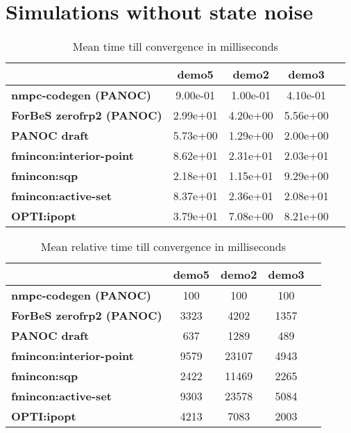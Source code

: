 \section{Simulations without state noise}
\label{appendix:benchmarks trailer without noise}

\begin{table}[H]
	\centering
	\begin{tabular}{|l|c|c|c|c|}
		\hline
		&\textbf{demo5}&\textbf{demo2}&\textbf{demo3}\\\hline
		\textbf{nmpc-codegen (PANOC)}&9.00e-01&1.00e-01&4.10e-01\\\hline
		\textbf{ForBeS zerofrp2 (PANOC)}&2.99e+01&4.20e+00&5.56e+00\\\hline
		\textbf{PANOC draft}&5.73e+00&1.29e+00&2.00e+00\\\hline
		\textbf{fmincon:interior-point}&8.62e+01&2.31e+01&2.03e+01\\\hline
		\textbf{fmincon:sqp}&2.18e+01&1.15e+01&9.29e+00\\\hline
		\textbf{fmincon:active-set}&8.37e+01&2.36e+01&2.08e+01\\\hline
		\textbf{OPTI:ipopt}&3.79e+01&7.08e+00&8.21e+00\\\hline
	\end{tabular}
	\caption{Mean time till convergence in milliseconds}
	\label{tbl:mean time till convergence}
\end{table}

\begin{table}[H]
	\centering
	\begin{tabular}{|l|c|c|c|c|}
		\hline
		&\textbf{demo5}&\textbf{demo2}&\textbf{demo3}\\\hline
		\textbf{nmpc-codegen (PANOC)}&100&100&100\\\hline
		\textbf{ForBeS zerofrp2 (PANOC)}&3323&4202&1357\\\hline
		\textbf{PANOC draft}&637&1289&489\\\hline
		\textbf{fmincon:interior-point}&9579&23107&4943\\\hline
		\textbf{fmincon:sqp}&2422&11469&2265\\\hline
		\textbf{fmincon:active-set}&9303&23578&5084\\\hline
		\textbf{OPTI:ipopt}&4213&7083&2003\\\hline
	\end{tabular}
	\caption{Mean relative time till convergence in milliseconds}
	\label{tbl:mean relative time till convergence}
\end{table}

